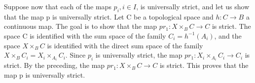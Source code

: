 Suppose now that each of the maps \(p_{i}, i \in I\), is universally strict, and let us show that the map p is universally strict. Let C be a topological space and \(h: C \to B\) a continuous map. The goal is to show that the map \(pr_{1}: X \times_{B} C \to C\) is strict. The space C is identified with the sum space of the family \(C_{i} = h^{-1}(A_{i})\), and the space \(X \times_{B} C\) is identified with the direct sum space of the family \(X \times_{B} C_{i} = X_{i} \times_{A_{i}} C_{i}\). Since \(p_{i}\) is universally strict, the map \(pr_{1}: X_{i} \times_{A_{i}} C_{i} \to C_{i}\) is strict. By the preceding, the map \(pr_{1}: X \times_{B} C \to C\) is strict. This proves that the map p is universally strict.

